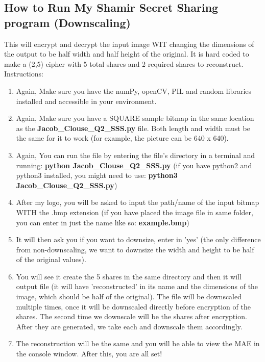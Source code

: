 \documentclass[10pt]{article}
\begin{document}
\subsection{How to Run My Shamir Secret Sharing program (Downscaling) } 
\noindent This will encrypt and decrypt the input image WIT changing the dimensions of the output to be half width and half height of the original. It is hard coded to make a (2,5) cipher with 5 total shares and 2 required shares to reconstruct. \\ Instructions: 
\begin{enumerate}
	\item Again, Make sure you have the numPy, openCV, PIL and random libraries installed and accessible in your environment.
	
	\item Again, Make sure you have a SQUARE sample bitmap in the same location as the \textbf{Jacob\_Clouse\_Q2\_SSS.py} file. Both length and width must be the same for it to work (for example, the picture can be 640 x 640).
	
	\item Again, You can run the file by entering the file's directory in a terminal and running: \textbf{python Jacob\_Clouse\_Q2\_SSS.py} (if you have python2 and python3 installed, you might need to use: \textbf{python3 Jacob\_Clouse\_Q2\_SSS.py})
	
	\item After my logo, you will be asked to input the path/name of the input bitmap WITH the .bmp extension (if you have placed the image file in same folder, you can enter in just the name like so: \textbf{example.bmp})
	
	\item It will then ask you if you want to downsize, enter in 'yes' (the only difference from non-downscaling, we want to downsize the width and height to be half of the original values). 
	
	\item You will see it create the 5 shares in the same directory and then it will output file (it will have 'reconstructed' in its name and the dimensions of the image, which should be half of the original). 
	\subitem The file will be downscaled multiple times, once it will be downscaled directly before encryption of the shares. 
	\subitem The second time we downscale will be the shares after encryption. After they are generated, we take each and downscale them accordingly.
	
	\item The reconstruction will be the same and you will be able to view the MAE in the console window. After this, you are all set!
	
\end{enumerate}
\vspace{0.2in}
\end{document}
